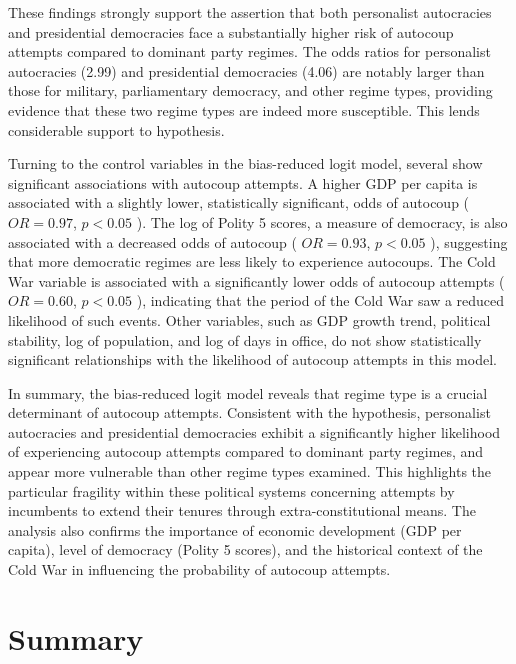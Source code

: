 \documentclass[
  12pt,
]{report}
\begin{document}
These findings strongly support the assertion that both personalist
autocracies and presidential democracies face a substantially higher
risk of autocoup attempts compared to dominant party regimes. The odds
ratios for personalist autocracies (2.99) and presidential democracies
(4.06) are notably larger than those for military, parliamentary
democracy, and other regime types, providing evidence that these two
regime types are indeed more susceptible. This lends considerable
support to hypothesis.

Turning to the control variables in the bias-reduced logit model,
several show significant associations with autocoup attempts. A higher
GDP per capita is associated with a slightly lower, statistically
significant, odds of autocoup ( \(OR = 0.97\), \(p<0.05\) ). The log of
Polity 5 scores, a measure of democracy, is also associated with a
decreased odds of autocoup ( \(OR = 0.93\), \(p<0.05\) ), suggesting
that more democratic regimes are less likely to experience autocoups.
The Cold War variable is associated with a significantly lower odds of
autocoup attempts ( \(OR = 0.60\), \(p<0.05\) ), indicating that the
period of the Cold War saw a reduced likelihood of such events. Other
variables, such as GDP growth trend, political stability, log of
population, and log of days in office, do not show statistically
significant relationships with the likelihood of autocoup attempts in
this model.

In summary, the bias-reduced logit model reveals that regime type is a
crucial determinant of autocoup attempts. Consistent with the
hypothesis, personalist autocracies and presidential democracies exhibit
a significantly higher likelihood of experiencing autocoup attempts
compared to dominant party regimes, and appear more vulnerable than
other regime types examined. This highlights the particular fragility
within these political systems concerning attempts by incumbents to
extend their tenures through extra-constitutional means. The analysis
also confirms the importance of economic development (GDP per capita),
level of democracy (Polity 5 scores), and the historical context of the
Cold War in influencing the probability of autocoup attempts.

\section{Summary}\label{summary-1}
\end{document}
